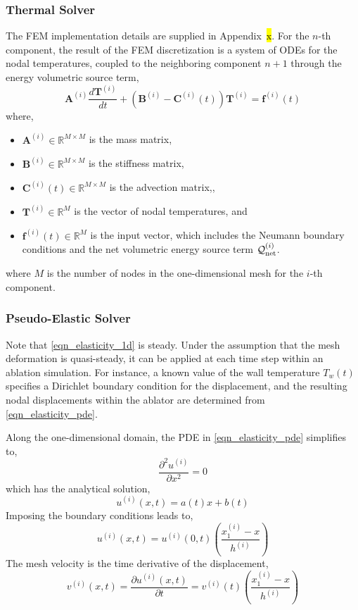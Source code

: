 \subsubsection{Thermal Solver}

The FEM implementation details are supplied in Appendix~\hl{x}. For the $n$-th component, the result of the FEM discretization is a system of ODEs for the nodal temperatures, coupled to the neighboring component $n+1$ through the energy volumetric source term,
\begin{equation}
    \mathbf{A}^{(i)}\frac{d\mathbf{T}^{(i)}}{dt} + \left(\mathbf{B}^{(i)} - \mathbf{C}^{(i)}(t)\right)\mathbf{T}^{(i)} = \mathbf{f}^{(i)}(t)
\end{equation}
where,
\begin{itemize}
    \item $\mathbf{A}^{(i)}\in\mathbb{R}^{M\times M}$ is the mass matrix,
    \item $\mathbf{B}^{(i)}\in\mathbb{R}^{M\times M}$ is the stiffness matrix,
    \item $\mathbf{C}^{(i)}(t)\in\mathbb{R}^{M\times M}$ is the advection matrix,,
    \item $\mathbf{T}^{(i)}\in\mathbb{R}^{M}$ is the vector of nodal temperatures, and
    \item $\mathbf{f}^{(i)}(t)\in\mathbb{R}^{M}$ is the input vector, which includes the Neumann boundary conditions and the net volumetric energy source term $\mathcal{Q}^{(i)}_{\text{net}}$.
\end{itemize}
where $M$ is the number of nodes in the one-dimensional mesh for the $i$-th component.

\subsubsection{Pseudo-Elastic Solver}

Note that \cref{eqn_elasticity_1d} is steady. Under the assumption that the mesh deformation is quasi-steady, it can be applied at each time step within an ablation simulation. For instance, a known value of the wall temperature $T_w(t)$ specifies a Dirichlet boundary condition for the displacement, and the resulting nodal displacements within the ablator are determined from \cref{eqn_elasticity_pde}.

Along the one-dimensional domain, the PDE in \cref{eqn_elasticity_pde} simplifies to,
\begin{equation}
    \frac{\partial^2 u^{(i)}}{\partial x^2} = 0
\end{equation}
which has the analytical solution,
\begin{equation}
    u^{(i)}(x,t) = a(t)x + b(t)
\end{equation}
Imposing the boundary conditions leads to,
\begin{equation}
    u^{(i)}(x,t) = u^{(i)}(0,t)\left(\frac{x_1^{(i)} - x}{h^{(i)}}\right)
\end{equation}
The mesh velocity is the time derivative of the displacement,
\begin{equation}
    v^{(i)}(x,t) = \frac{\partial u^{(i)}(x,t)}{\partial t} = v^{(i)}(t)\left(\frac{x_1^{(i)} - x}{h^{(i)}}\right)
\end{equation}

